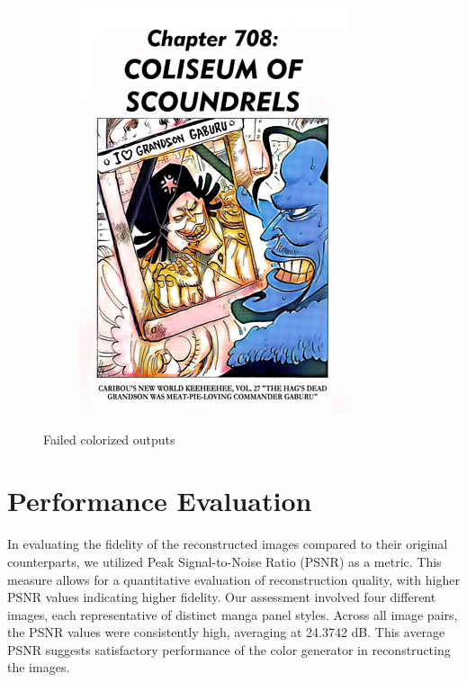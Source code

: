 \begin{figure}[hbtp]
\begin{subfigure}[b]{0.45\textwidth}
        \includegraphics[width=\textwidth]{chapter/actual/ac1.png}
    \end{subfigure}
    \caption{Failed colorized outputs}
        \label{fig:bad_images}
\end{figure}


\section{Performance Evaluation}
In evaluating the fidelity of the reconstructed images compared to their original counterparts, we utilized Peak Signal-to-Noise Ratio (PSNR) as a metric. This measure allows for a quantitative evaluation of reconstruction quality, with higher PSNR values indicating higher fidelity. Our assessment involved four different images, each representative of distinct manga panel styles. Across all image pairs, the PSNR values were consistently high, averaging at 24.3742 dB. This average PSNR suggests satisfactory performance of the color generator in reconstructing the images.


